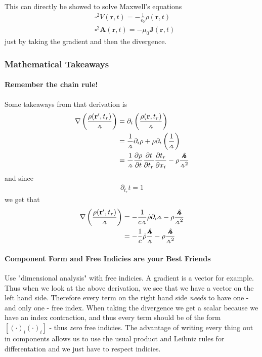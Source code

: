 This can directly be showed to solve Maxwell's equations \begin{align*}
    &\square^{2} V(\mathbf{r}, t) = - \frac{1}{\epsilon _0} \rho (\mathbf{r}, t)\\
    &\square^{2} \mathbf{A}(\mathbf{r}, t) = -\mu _0 \mathbf{J}(\mathbf{r}, t)
\end{align*}
just by taking the gradient and then the divergence. 
\subsubsection*{Mathematical Takeaways}
\paragraph{Remember the chain rule!}
Some takeaways from that derivation is \begin{align*}
    \nabla \left( \frac{\rho (\mathbf{r}^{\prime} , t_r)}{\griffr[2] } \right) &= \partial  _i \left( \frac{\rho (\mathbf{r}, t_r)}{\griffr[2] } \right)\\
    &= \frac{1}{\griffr[2] }\partial  _i \rho + \rho \partial_i \left( \frac{1}{\griffr[2] } \right) \\
    &= \frac{1}{\griffr[2] }\frac{\partial \rho}{\partial t} \frac{\partial t}{\partial t_r} \frac{\partial t_r}{\partial x_{i} }  - \rho \frac{\hatgriffr }{\griffr[2] ^{2} } \\
\end{align*}
and since \begin{align*}
    \partial _{t_r} t = 1
\end{align*}
we get that \begin{align*}
    \nabla \left( \frac{\rho (\mathbf{r}^{\prime} , t_r)}{\griffr[2] } \right) &= -\frac{1}{c \griffr[2] }\dot{\rho} \partial _i \griffr[2] - \rho \frac{\hatgriffr }{\griffr[2] ^{2} }\\
    &= -\frac{1}{c} \dot{\rho }\frac{\hatgriffr }{\griffr[2] } -  \rho \frac{\hatgriffr }{\griffr[2] ^{2} }
\end{align*}
\paragraph{Component Form and Free Indicies are your Best Friends}
Use "dimensional analysis" with free indicies. A gradient is a vector for example. Thus when we look at the above derivation, we see that we have a vector on the left hand side. Therefore every term on the right hand side \textit{needs} to have one - and only one - free index. When taking the divergence we get a scalar because we have an index contraction, and thus every term should be of the form \(\left[   \left( \cdot  \right)_i \left( \cdot  \right)_i\right]\) - thus \textit{zero} free indicies. The advantage of writing every thing out in components allows us to use the usual product and Leibniz rules for differentation and we just have to respect indicies. 

